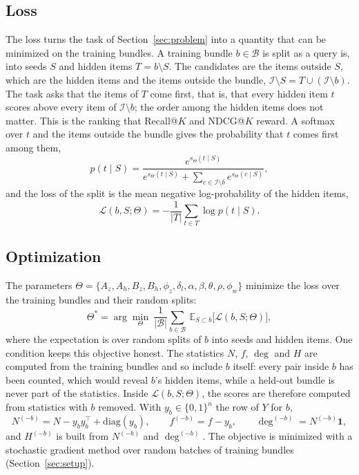 \documentclass[runningheads]{llncs}
\newcommand{\B}{\mathcal{B}}
\begin{document}
\subsection{Loss}

The loss turns the task of Section~\ref{sec:problem} into a quantity that can be minimized on the training bundles.
A training bundle $b\in\B$ is split as a query is, into seeds $S$ and hidden items $T=b\setminus S$. The candidates are the items outside $S$, which are the hidden items and the items outside the
bundle, $\mathcal{I}\setminus S=T\cup(\mathcal{I}\setminus b)$. The task asks that the items of $T$ come first, that
is, that every hidden item $t$ scores above every item of $\mathcal{I}\setminus b$; the order among the hidden items
does not matter. This is the ranking that Recall@$K$ and NDCG@$K$ reward. A softmax over $t$ and the items outside the
bundle gives the probability that $t$ comes first among them,
\begin{equation}
p(t\mid S)=\frac{e^{s_\Theta(t\mid S)}}{e^{s_\Theta(t\mid S)}+\sum_{c\in\mathcal{I}\setminus b}e^{s_\Theta(c\mid S)}},
\end{equation}
and the loss of the split is the mean negative log-probability of the hidden items,
\begin{equation}
\mathcal{L}(b,S;\Theta)=-\frac{1}{|T|}\sum_{t\in T}\log p(t\mid S).
\label{eq:loss}
\end{equation}

\subsection{Optimization}

The parameters $\Theta=\{A_z,A_h,B_z,B_h,\phi_z,\delta_l,\alpha,\beta,\theta,\rho,\phi_w\}$ minimize the loss over the
training bundles and their random splits:
\begin{equation}
\Theta^{*}=\arg\min_{\Theta}\ \frac{1}{|\B|}\sum_{b\in\B}\ \mathbb{E}_{S\subset b}\big[\mathcal{L}(b,S;\Theta)\big],
\label{eq:objective}
\end{equation}
where the expectation is over random splits of $b$ into seeds and hidden items. One condition keeps this objective
honest. The statistics $N$, $f$, $\deg$ and $H$ are computed from the training bundles and so include $b$ itself:
every pair inside $b$ has been counted, which would reveal $b$'s hidden items, while a held-out bundle is never part of
the statistics. Inside $\mathcal{L}(b,S;\Theta)$, the scores are therefore computed from statistics with $b$ removed.
With $y_b\in\{0,1\}^n$ the row of $Y$ for $b$,
\begin{equation}
N^{(-b)}=N-y_by_b^{\top}+\mathrm{diag}(y_b),\qquad f^{(-b)}=f-y_b,\qquad \deg^{(-b)}=N^{(-b)}\mathbf{1},
\end{equation}
and $H^{(-b)}$ is built from $N^{(-b)}$ and $\deg^{(-b)}$. The objective is minimized with a stochastic gradient method over random batches of
training bundles (Section~\ref{sec:setup}).
\end{document}
